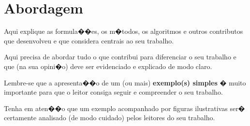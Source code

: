 \section{Abordagem}
\label{sec:abordagem}

Aqui explique as formula��es, os m�todos, os algoritmos e outros contributos que desenvolveu e que considera centrais ao seu trabalho.

Aqui precisa de abordar tudo o que contribui para diferenciar o seu trabalho e que (na sua opini�o) deve ser evidenciado e explicado de modo claro.

Lembre-se que a apresenta��o de um (ou mais) \textbf{exemplo(s) simples} � muito importante para que o leitor consiga seguir e compreender o seu trabalho.

Tenha em aten��o que um exemplo acompanhado por figuras ilustrativas ser� certamente analisado (de modo cuidado) pelos leitores do seu trabalho.

